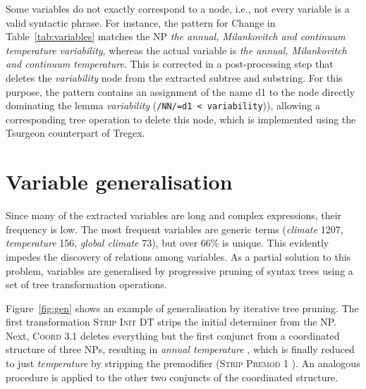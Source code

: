 \documentclass[11pt]{article}
\begin{document}
Some variables do not exactly correspond to a node, i.e., not every variable is a valid syntactic phrase.
For instance, the pattern for Change in Table~\ref{tab:variables} matches the NP \emph{the annual, Milankovitch and continuum temperature variability}, whereas the actual variable is \emph{the annual, Milankovitch and continuum temperature}.
This is corrected in a post-processing step that deletes the \emph{variability} node from the extracted subtree and substring.
For this purpose, the pattern contains an assignment of the name d1 to the node directly dominating the lemma \emph{variability} (\verb|/NN/=d1 < variability|)), allowing a corresponding tree operation to delete this node, which is implemented using the Tsurgeon counterpart of Tregex.
 
\section{Variable generalisation}

Since many of the extracted variables are long and complex expressions, their frequency is low.
The most frequent variables are generic terms (\emph{climate} 1207,  \emph{temperature} 156, \emph{global climate} 73), but over 66\% is unique.
This evidently impedes the discovery of relations among variables.
As a partial solution to this problem, variables are generalised by progressive pruning of syntax trees using a set of tree transformation operations.

Figure~\ref{fig:gen} shows an example of generalisation by iterative tree pruning.
The first transformation \textsc{Strip Init DT}  strips the initial determiner from the NP.
Next,  \textsc{Coord 3.1}  deletes everything but the first conjunct from a coordinated structure of three NPs, resulting in \emph{annual temperature} , which is finally reduced to just \emph{temperature} by stripping the premodifier (\textsc{Strip Premod 1} ).
An analogous procedure is applied to the other two conjuncts of the coordinated structure.
\end{document}
